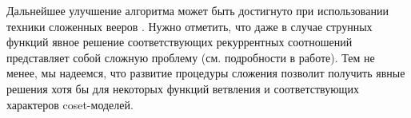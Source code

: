 Дальнейшее улучшение алгоритма может быть достигнуто при использовании техники сложенных вееров \cite{il2010folded}. Нужно отметить, что даже в случае струнных функций явное решение соответствующих рекуррентных соотношений представляет собой сложную проблему (см. подробности в работе\cite{il2010folded}). Тем не менее, мы надеемся, что развитие процедуры сложения позволит получить явные решения хотя бы для некоторых функций ветвления и соответствующих характеров coset-моделей.




